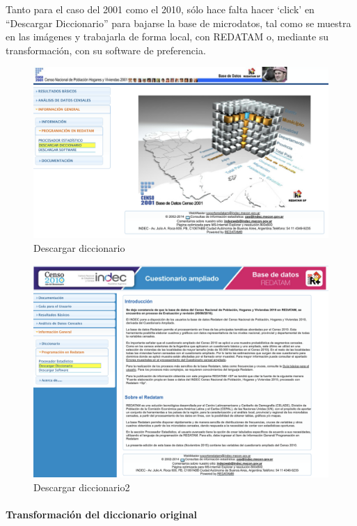 \documentclass[
]{article}
\begin{document}
Tanto para el caso del 2001 como el 2010, sólo hace falta hacer `click' en ``Descargar Diccionario'' para bajarse la base de microdatos, tal como se muestra en las imágenes y trabajarla de forma local, con REDATAM o, mediante su transformación, con su software de preferencia.

\begin{figure}

{\centering \includegraphics[width=0.8\linewidth]{imagenes/dic2001} 

}

\caption{Descargar diccionario}\label{fig:unnamed-chunk-34}
\end{figure}

\begin{figure}

{\centering \includegraphics[width=0.8\linewidth]{imagenes/dic2010} 

}

\caption{Descargar diccionario2}\label{fig:unnamed-chunk-35}
\end{figure}

\hypertarget{transformaciuxf3n-del-diccionario-original}{%
\paragraph{Transformación del diccionario original}\label{transformaciuxf3n-del-diccionario-original}}
\end{document}

